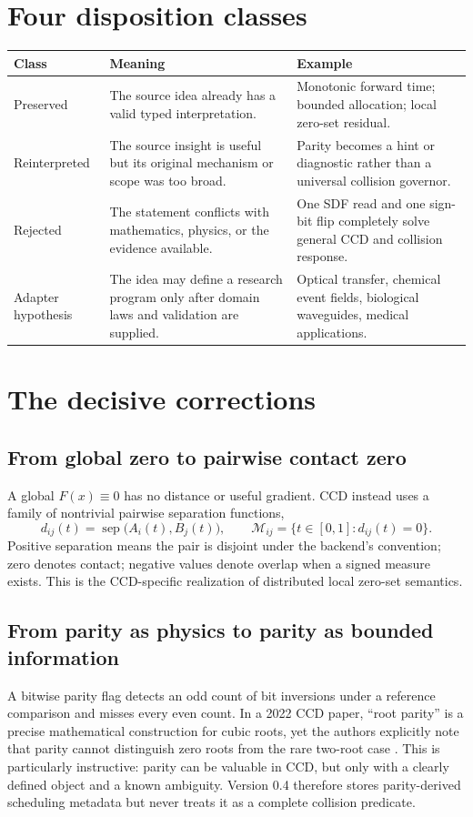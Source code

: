 \documentclass[11pt,a4paper,openany]{book}
\newcommand{\sepfn}{d_{ij}}
\begin{document}
\section{Four disposition classes}
\begin{tabularx}{\textwidth}{@{}L{0.18\textwidth}Y Y@{}}
\toprule
Class & Meaning & Example \\
\midrule
Preserved & The source idea already has a valid typed interpretation. & Monotonic forward time; bounded allocation; local zero-set residual. \\
Reinterpreted & The source insight is useful but its original mechanism or scope was too broad. & Parity becomes a hint or diagnostic rather than a universal collision governor. \\
Rejected & The statement conflicts with mathematics, physics, or the evidence available. & One SDF read and one sign-bit flip completely solve general CCD and collision response. \\
Adapter hypothesis & The idea may define a research program only after domain laws and validation are supplied. & Optical transfer, chemical event fields, biological waveguides, medical applications. \\
\bottomrule
\end{tabularx}

\section{The decisive corrections}
\subsection{From global zero to pairwise contact zero}
A global $F(x)\equiv 0$ has no distance or useful gradient. CCD instead uses a family of nontrivial pairwise separation functions,
\begin{equation}
  \sepfn(t)=\operatorname{sep}\big(A_i(t),B_j(t)\big),
  \qquad \mathcal{M}_{ij}=\{t\in[0,1]:\sepfn(t)=0\}.
\end{equation}
Positive separation means the pair is disjoint under the backend's convention; zero denotes contact; negative values denote overlap when a signed measure exists. This is the CCD-specific realization of distributed local zero-set semantics.

\subsection{From parity as physics to parity as bounded information}
A bitwise parity flag detects an odd count of bit inversions under a reference comparison and misses every even count. In a 2022 CCD paper, ``root parity'' is a precise mathematical construction for cubic roots, yet the authors explicitly note that parity cannot distinguish zero roots from the rare two-root case \citep{wang2022rootparity}. This is particularly instructive: parity can be valuable in CCD, but only with a clearly defined object and a known ambiguity. Version 0.4 therefore stores parity-derived scheduling metadata but never treats it as a complete collision predicate.
\end{document}
